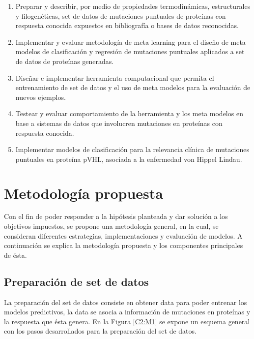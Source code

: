 \begin{enumerate}
	
	\item Preparar y describir, por medio de propiedades termodinámicas, estructurales y filogenéticas, set de datos de mutaciones puntuales de proteínas con respuesta conocida expuestos en bibliografía o bases de datos reconocidas.
	
	\item Implementar y evaluar metodología de meta learning para el diseño de meta modelos de clasificación y regresión de mutaciones puntuales aplicados a set de datos de proteínas generadas.
	
	\item Diseñar e implementar herramienta computacional que permita el entrenamiento de set de datos y el uso de meta modelos para la evaluación de nuevos ejemplos.
	
	\item Testear y evaluar comportamiento de la herramienta y los meta modelos en base a sistemas de datos que involucren mutaciones en proteínas con respuesta conocida.
	
	\item Implementar modelos de clasificación para la relevancia clínica de mutaciones puntuales en proteína pVHL, asociada a la enfermedad von Hippel Lindau. 
	
\end{enumerate}

\section{Metodología propuesta}

Con el fin de poder responder a la hipótesis planteada y dar solución a los objetivos impuestos, se propone una metodología general, en la cual, se consideran diferentes estrategias, implementaciones y evaluación de modelos. A continuación se explica la metodología propuesta y los componentes principales de ésta.

\subsection{Preparación de set de datos}

La preparación del set de datos consiste en obtener data para poder entrenar los modelos  predictivos, la data se asocia a información de mutaciones en proteínas y la respuesta que ésta genera. En la Figura \ref{C2:M1} se expone un esquema general con los pasos desarrollados para la preparación del set de datos.

